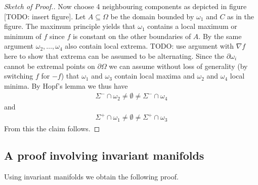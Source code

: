 \begin{proof}[Sketch of Proof.]
  Now choose 4 neighbouring components as depicted in figure [TODO: insert figure]. 
  Let $A\subseteq\Omega$ be the domain bounded
  by $\omega_1$ and $C$ as in the figure. The maximum principle yields that $\omega_1$ contains a local maximum or minimum of $f$ since
  $f$ is constant on the other boundaries of $A$.
  By the same argument $\omega_2,\dots,\omega_4$ also contain local extrema. 
  TODO: use argument with $\nabla f$ here to show that extrema can be assumed to be alternating.
  Since the $\partial\omega_i$ cannot be extremal points on $\partial\Omega$
  we can assume without loss of generality (by switching $f$ for $-f$) that $\omega_1$ and $\omega_3$ contain local maxima and $\omega_2 $ and $\omega_4$ local
  minima. By Hopf's lemma we thus have
  \begin{align*}
    \Sigma^-\cap\omega_2\neq\emptyset\neq\Sigma^-\cap\omega_4
  \end{align*}
  and 
  \begin{align*}
    \Sigma^+\cap\omega_1\neq\emptyset\neq\Sigma^+\cap\omega_3
  \end{align*}
  From this the claim follows.
\end{proof}

\subsection*{A proof involving invariant manifolds}

Using invariant manifolds we obtain the following proof.

